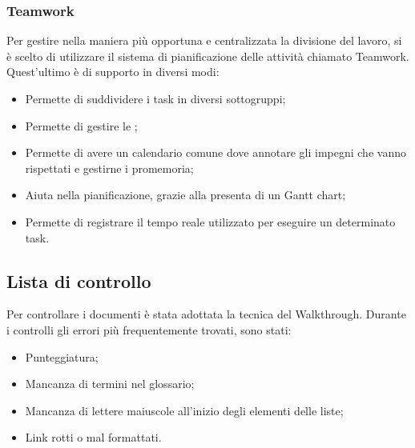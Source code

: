 \documentclass[../NormeDiProgetto.tex]{subfiles}
\begin{document}
\subsubsection{Teamwork}
Per gestire nella maniera più opportuna e centralizzata la divisione del lavoro, si è scelto di utilizzare il sistema di pianificazione delle attività chiamato Teamwork.
Quest'ultimo è di supporto in diversi modi:
\begin{itemize}
\item Permette di suddividere i task in diversi sottogruppi;
\item Permette di gestire le ;
\item Permette di avere un calendario comune dove annotare gli impegni che vanno rispettati e gestirne i promemoria;
\item Aiuta nella pianificazione, grazie alla presenta di un Gantt chart;
\item Permette di registrare il tempo reale utilizzato per eseguire un determinato task.
\end{itemize}

\subsection{Lista di controllo}
Per controllare i documenti è stata adottata la tecnica del Walkthrough.
Durante i controlli gli errori più frequentemente trovati, sono stati:
\begin{itemize}
	\item Punteggiatura;
	\item Mancanza di termini nel glossario;
	\item Mancanza di lettere maiuscole all'inizio degli elementi delle liste;
	\item Link rotti o mal formattati.
\end{itemize}
\end{document}

